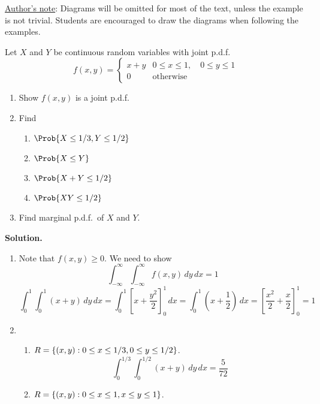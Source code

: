 \underline{Author's note}: Diagrams will be omitted for most of the text,
unless the example is not trivial. Students are encouraged
to draw the diagrams when following the examples.
\begin{Example}{}{}
    Let $ X $ and $ Y $ be continuous random variables
    with joint p.d.f.\
    \[ f(x,y)=
        \begin{cases}
            x+y & 0\le x\le 1,\quad 0\le y\le 1 \\
            0   & \text{otherwise}
        \end{cases} \]
    \begin{enumerate}[label=(\roman*)]
        \item Show $ f(x,y) $ is a joint p.d.f.\
        \item Find
              \begin{enumerate}[label=(\alph*)]
                  \item $ \Prob{X\le 1/3, Y\le 1/2} $
                  \item $ \Prob{X\le Y} $
                  \item $ \Prob{X+Y\le 1/2} $
                  \item $ \Prob{XY\le 1/2} $
              \end{enumerate}
        \item Find marginal p.d.f.\ of $ X $ and $ Y $.
    \end{enumerate}
    \textbf{Solution.}
    \begin{enumerate}[label=(\roman*)]
        \item Note that $ f(x,y)\ge 0 $. We need to show
              \[ \int_{-\infty}^{\infty} \int_{-\infty}^{\infty} f(x,y)\, d{y} \, d{x} =1 \]
              \[ \int_{0}^{1} \int_{0}^{1} (x+y)\, d{y} \, d{x}
                  =\int_{0}^{1} \left[ x+\frac{y^2}{2} \right]_0^1\, d{x}
                  =\int_{0}^{1} \left( x+\frac{1}{2} \right)\, d{x}
                  =\left[ \frac{x^2}{2}  +\frac{x}{2}\right]_0^1
                  =1
              \]
        \item \begin{enumerate}[label=(\alph*)]
                  \item $ R=\{(x,y):0\le x\le 1/3, 0\le y
                                \le 1/2\} $.
                        \[ \int_{0}^{1/3} \int_{0}^{1/2} (x+y)\, d{y} \, d{x} =\frac{5}{72} \]
                  \item $ R=\{(x,y):0\le x\le 1,x\le y\le 1\} $.
                        \[
\]
\end{enumerate}
\end{enumerate}
\end{Example}
